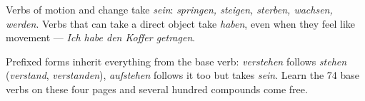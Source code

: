 \begin{gnote}
Verbs of motion and change take \textit{sein}: \textit{springen, steigen,
sterben, wachsen, werden}. Verbs that can take a direct object take
\textit{haben}, even when they feel like movement — \textit{Ich habe den Koffer
getragen}.
\end{gnote}

\begin{gnote}
Prefixed forms inherit everything from the base verb: \textit{verstehen} follows
\textit{stehen} (\textit{verstand}, \textit{verstanden}), \textit{aufstehen}
follows it too but takes \textit{sein}. Learn the 74 base verbs on these four
pages and several hundred compounds come free.
\end{gnote}
